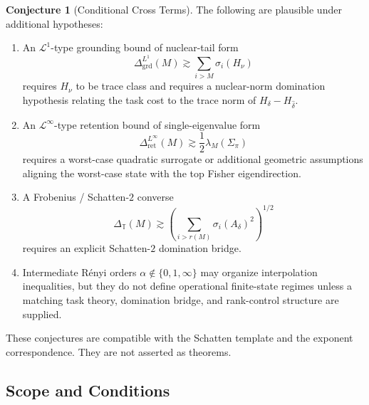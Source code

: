 \documentclass[12pt]{article}
\theoremstyle{definition}
\newtheorem{conjecture}[theorem]{Conjecture}
\begin{document}
\begin{conjecture}[Conditional Cross Terms]
\label{conj:cross-terms}
The following are plausible under additional hypotheses:
\begin{enumerate}[label=(\arabic*),leftmargin=2.0em]
\item An $\mathcal L^1$-type grounding bound of nuclear-tail form
\[
\Delta_{\mathrm{grd}}^{L^1}(M)
\gtrsim
\sum_{i>M}
\sigma_i(H_\nu)
\]
requires $H_\nu$ to be trace class and requires a nuclear-norm
domination hypothesis relating the task cost to the trace norm of
$H_\delta-H_{\widehat\delta}$.

\item An $\mathcal L^\infty$-type retention bound of single-eigenvalue form
\[
\Delta_{\mathrm{ret}}^{L^\infty}(M)
\gtrsim
\frac12
\lambda_M(\Sigma_\pi)
\]
requires a worst-case quadratic surrogate or additional geometric
assumptions aligning the worst-case state with the top Fisher
eigendirection.

\item A Frobenius / Schatten-$2$ converse
\[
\Delta_{\mathbb T}(M)
\gtrsim
\left(
\sum_{i>r(M)}
\sigma_i(A_\delta)^2
\right)^{1/2}
\]
requires an explicit Schatten-$2$ domination bridge.

\item Intermediate R\'enyi orders $\alpha\notin\{0,1,\infty\}$ may organize
interpolation inequalities, but they do not define operational
finite-state regimes unless a matching task theory, domination bridge,
and rank-control structure are supplied.
\end{enumerate}
\end{conjecture}

These conjectures are compatible with the Schatten template and the exponent
correspondence.  They are not asserted as theorems.

\subsection{Scope and Conditions}
\label{subsec:spectral-scope}
\end{document}
